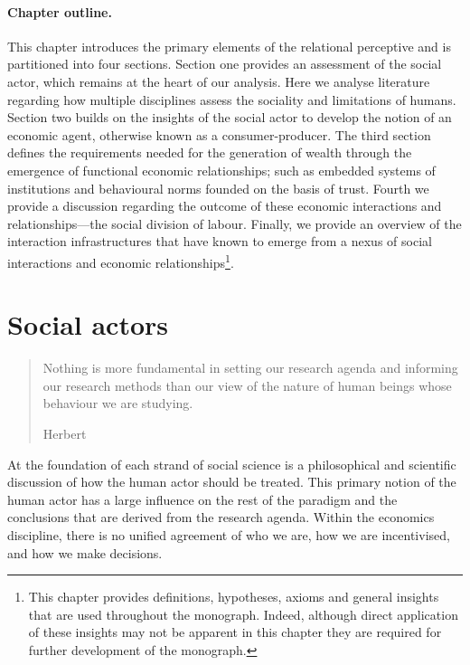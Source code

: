 \paragraph{Chapter outline.}

This chapter introduces the primary elements of the relational perceptive and is partitioned into four sections. Section one provides an assessment of the social actor, which remains at the heart of our analysis. Here we analyse literature regarding how multiple disciplines assess the sociality and limitations of humans. Section two builds on the insights of the social actor to develop the notion of an economic agent, otherwise known as a consumer-producer. The third section defines the requirements needed for the generation of wealth through the emergence of functional economic relationships; such as embedded systems of institutions and behavioural norms founded on the basis of trust. Fourth we provide a discussion regarding the outcome of these economic interactions and relationships---the social division of labour. Finally, we provide an overview of the interaction infrastructures that have known to emerge from a nexus of social interactions and economic relationships\footnote{This chapter provides definitions, hypotheses, axioms and general insights that are used throughout the monograph. Indeed, although direct application of these insights may not be apparent in this chapter they are required for further development of the monograph.}.

\section{Social actors}

\begin{quote}
Nothing is more fundamental in setting our research agenda and informing our research methods than our view of the nature of human beings whose behaviour we are studying.

\begin{flushright}
Herbert \citet[p.~303]{Simon1985}
\end{flushright}
\end{quote}

At the foundation of each strand of social science is a philosophical and scientific discussion of how the human actor should be treated. This primary notion of the human actor has a large influence on the rest of the paradigm and the conclusions that are derived from the research agenda. Within the economics discipline, there is no unified agreement of who we are, how we are incentivised, and how we make decisions. 

